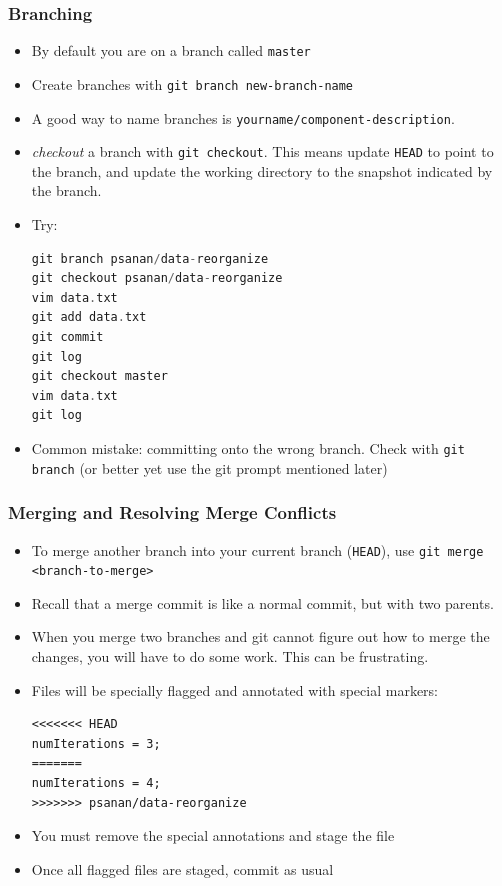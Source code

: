 \documentclass{beamer}
\begin{document}
\begin{frame}[fragile]
\frametitle{Branching}
\begin{itemize}
\item By default you are on a branch called \texttt{master}
\item Create branches with \lstinline{git branch new-branch-name}
\item A good way to name branches is \lstinline{yourname/component-description}.
\item \emph{checkout} a branch with \lstinline{git checkout}. This means update \texttt{HEAD} to point to the branch, and update the working directory to the snapshot indicated by the branch.
\item Try:
\begin{lstlisting}[language=C++]
git branch psanan/data-reorganize
git checkout psanan/data-reorganize
vim data.txt
git add data.txt
git commit
git log
git checkout master
vim data.txt
git log
\end{lstlisting}
\item Common mistake: committing onto the wrong branch. Check with \lstinline{git branch} (or better yet use the git prompt mentioned later)
\end{itemize}
\end{frame}

\begin{frame}[fragile]
\frametitle{Merging and Resolving Merge Conflicts}
\begin{itemize}
\item To merge another branch into your current branch (\texttt{HEAD}), use \lstinline{git merge <branch-to-merge>}
\item Recall that a merge commit is like a normal commit, but with two parents.
\item When you merge two branches and git cannot figure out how to merge the changes, you will have to do some work. This can be frustrating.
\item Files will be specially flagged and annotated with special markers:
\begin{verbatim}
<<<<<<< HEAD
numIterations = 3;
=======
numIterations = 4;
>>>>>>> psanan/data-reorganize
\end{verbatim}
\item You must remove the special annotations and stage the file
\item Once all flagged files are staged, commit as usual
\end{itemize}
\end{frame}
\end{document}
